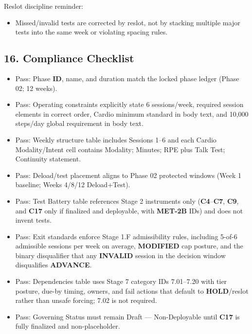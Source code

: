 \documentclass[10pt]{article}
\begin{document}
Reslot discipline reminder:

\begin{itemize}
\item Missed/invalid tests are corrected by reslot, not by stacking multiple major tests into the same week or violating spacing rules.
\end{itemize}

\subsection*{16. Compliance Checklist}

\begin{itemize}
\item Pass: Phase \textbf{ID}, name, and duration match the locked phase ledger (Phase 02; 12 weeks).
\item Pass: Operating constraints explicitly state 6 sessions/week, required session elements in correct order, Cardio minimum standard in body text, and 10,000 steps/day global requirement in body text.
\item Pass: Weekly structure table includes Sessions 1–6 and each Cardio Modality/Intent cell contains Modality; Minutes; RPE plus Talk Test; Continuity statement.
\item Pass: Deload/test placement aligns to Phase 02 protected windows (Week 1 baseline; Weeks 4/8/12 Deload+Test).
\item Pass: Test Battery table references Stage 2 instruments only (\textbf{C4}–\textbf{C7}, \textbf{C9}, and \textbf{C17} only if finalized and deployable, with \textbf{MET-2B} IDs) and does not invent tests.
\item Pass: Exit standards enforce Stage 1.F admissibility rules, including 5-of-6 admissible sessions per week on average, \textbf{MODIFIED} cap posture, and the binary disqualifier that any \textbf{INVALID} session in the decision window disqualifies \textbf{ADVANCE}.
\item Pass: Dependencies table uses Stage 7 category IDs 7.01–7.20 with tier posture, due-by timing, owners, and fail actions that default to \textbf{HOLD}/reslot rather than unsafe forcing; 7.02 is not required.
\item Pass: Governing Status must remain Draft — Non-Deployable until \textbf{C17} is fully finalized and non-placeholder.
\end{itemize}
\end{document}
